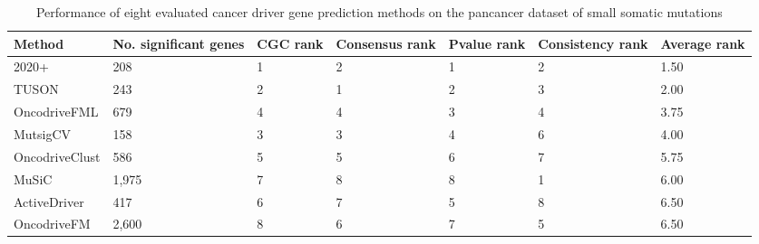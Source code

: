 \makeatletter
\let\@currsize\normalsize
\ssp
\begin{table}
\begin{tabular}{p{3cm} p{3cm} p{2.25cm} p{2.25cm} p{2.25cm} p{2.25cm} p{2.25cm}}
\toprule
  Method & No. significant genes &  CGC rank &  Consensus rank &  Pvalue rank &  Consistency rank &  Average rank \\
\midrule
  2020+ &  208 &  1 &  2 &  1 &  2 &  1.50 \\
  TUSON &  243 &  2 &  1 &  2 &  3 &  2.00 \\
  OncodriveFML &  679 &  4 &  4 &  3 &  4 &  3.75 \\
  MutsigCV &  158 &  3 &  3 &  4 &  6 &  4.00 \\
  OncodriveClust &  586 &  5 &  5 &  6 &  7 &  5.75 \\
  MuSiC &  1,975 &  7 &  8 &  8 &  1 &  6.00 \\
  ActiveDriver &  417 &  6 &  7 &  5 &  8 &  6.50 \\
  OncodriveFM &  2,600 &  8 &  6 &  7 &  5 &  6.50 \\ 
\bottomrule
\end{tabular}
\caption[Overall performance identifying cancer driver genes]{Performance of eight evaluated cancer driver gene prediction methods on the pancancer dataset of small somatic mutations}
\label{tab:overall_performance}
\end{table}
\dsp

